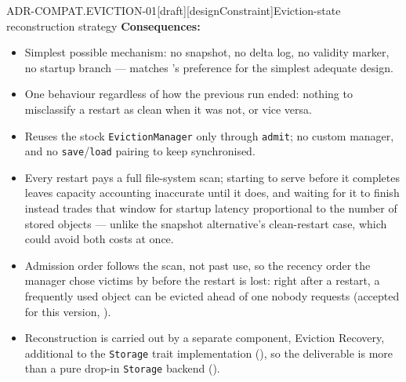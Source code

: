 \begin{requirement}{ADR-COMPAT.EVICTION-01}[draft][designConstraint]{Eviction-state reconstruction strategy}
  \textbf{Consequences:}
  \begin{itemize}
    \item[+] Simplest possible mechanism: no snapshot, no delta log, no
      validity marker, no startup branch --- matches 's
      preference for the simplest adequate design.
    \item[+] One behaviour regardless of how the previous run ended: nothing
      to misclassify a restart as clean when it was not, or vice versa.
    \item[+] Reuses the stock \texttt{EvictionManager} only through
      \texttt{admit}; no custom manager, and no \texttt{save}/\texttt{load}
      pairing to keep synchronised.
    \item[--] Every restart pays a full file-system scan; starting to serve
      before it completes leaves capacity accounting inaccurate until it
      does, and waiting for it to finish instead trades that window for
      startup latency proportional to the number of stored objects ---
      unlike the snapshot alternative's clean-restart case, which could
      avoid both costs at once.
    \item[--] Admission order follows the scan, not past use, so the
      recency order the manager chose victims by before the restart is lost:
      right after a restart, a frequently used object can be evicted ahead of
      one nobody requests (accepted for this version,
      ).
    \item[--] Reconstruction is carried out by a separate component, Eviction
      Recovery, additional to the \texttt{Storage} trait implementation
      (), so the deliverable is more than a pure
      drop-in \texttt{Storage} backend ().
  \end{itemize}



\end{requirement}

